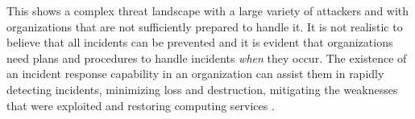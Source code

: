 This shows a complex threat landscape with a large variety of attackers and with organizations that are not sufficiently prepared to handle it. It is not realistic to believe that all incidents can be prevented and it is evident that organizations need plans and procedures to handle incidents \textit{when} they occur. The existence of an incident response capability in an organization can assist them in rapidly detecting incidents, minimizing loss and destruction, mitigating the weaknesses that were exploited and restoring computing services \cite{nist800-61}. 

